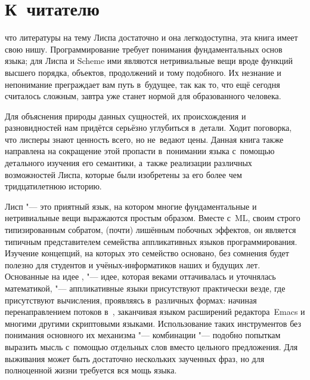 \chapter{К~читателю}\label{chapter:to_the_reader}

 что литературы на
тему Лиспа достаточно и она легкодоступна, эта книга имеет свою нишу.
Программирование требует понимания фундаментальных основ языка; для Лиспа и
Scheme ими являются нетривиальные вещи вроде функций высшего порядка, объектов,
продолжений и тому подобного. Их незнание и непонимание преграждает вам путь
в~будущее, так как то, что ещё сегодня считалось сложным, завтра уже станет
нормой для образованного человека.

Для объяснения природы данных сущностей, их происхождения и разновидностей
нам придётся серьёзно углубиться в~детали. Ходит поговорка, что лисперы знают
ценность всего, но не~ведают цены. Данная книга также направлена на сокращение
этой пропасти в~понимании языка с~помощью детального изучения его семантики,
а~также реализации различных возможностей Лиспа, которые были изобретены за его
более чем тридцатилетнюю историю.

Лисп "--- это приятный язык, на котором многие фундаментальные и нетривиальные
вещи выражаются простым образом. Вместе с~ML, своим строго типизированным
собратом, (почти) лишённым побочных эффектов, он является типичным
представителем семейства аппликативных языков программирования. Изучение
концепций, на которых это семейство основано, без сомнения будет полезно для
студентов и учёных-информатиков наших и будущих лет. Основанные на идее
, "--- идее, которая веками оттачивалась и уточнялась математикой,
"--- аппликативные языки присутствуют практически везде, где присутствуют
вычисления, проявляясь в~различных формах: начиная перенаправлением потоков
в~\UNIX, заканчивая языком расширений редактора~Emacs и многими другими
скриптовыми языками. Использование таких инструментов без понимания основного их
механизма "--- комбинации "--- подобно попыткам выразить мысль с~помощью
отдельных слов вместо цельного предложения. Для выживания может быть достаточно
нескольких заученных фраз, но для полноценной жизни требуется вся мощь языка.


